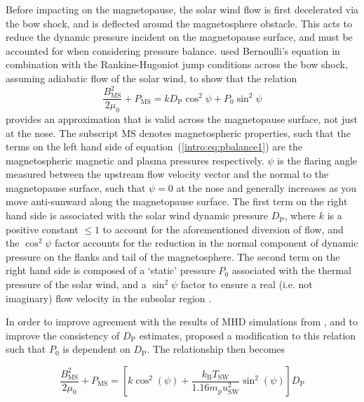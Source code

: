 Before impacting on the magnetopause, the solar wind flow is first decelerated via the bow shock, and is deflected around the magnetosphere obstacle. This acts to reduce the dynamic pressure incident on the magnetopause surface, and must be accounted for when considering pressure balance. \citet{petrinec1997} used Bernoulli's equation in combination with the Rankine-Hugoniot jump conditions across the bow shock, assuming adiabatic flow of the solar wind, to show that the relation
\begin{equation}\label{intro:eq:pbalance1}
\frac{B_{\mathrm{MS}}^2}{2\mu_0} + P_{\mathrm{MS}} = kD_\mathrm{P}\cos^2\psi + P_0\sin^2\psi
\end{equation}
provides an approximation that is valid across the magnetopause surface, not just at the nose. The subscript {\scshape{MS}} denotes magnetospheric properties, such that the terms on the left hand side of equation~(\ref{intro:eq:pbalance1}) are the magnetospheric magnetic and plasma pressures respectively. $\psi$ is the flaring angle measured between the upstream flow velocity vector and the normal to the magnetopause surface, such that $\psi=0$ at the nose and generally increases as you move anti-sunward along the magnetopause surface. The first term on the right hand side is associated with the solar wind dynamic pressure $D_\mathrm{P}$, where $k$ is a positive constant $\leq1$ to account for the aforementioned diversion of flow, and the $\cos^2\psi$ factor accounts for the reduction in the normal component of dynamic pressure on the flanks and tail of the magnetosphere. The second term on the right hand side is composed of a `static' pressure $P_0$ associated with the thermal pressure of the solar wind, and a $\sin^2\psi$ factor to ensure a real (i.e. not imaginary) flow velocity in the subsolar region \citep[see][]{petrinec1997}.

In order to improve agreement with the results of MHD simulations from \citet{hansen2005}, and to improve the consistency of $D_\mathrm{P}$ estimates, \citet{kanani2010} proposed a modification to this relation such that $P_0$ is dependent on $D_\mathrm{P}$. The relationship then becomes

\begin{equation}\label{intro:eq:pbalance2}
\frac{B_\mathrm{MS}^2}{2\mu_0} + P_\mathrm{MS} = \left[k\cos^2(\psi) + \frac{k_\mathrm{B}T_\mathrm{SW}}{1.16m_\mathrm{p}u_\mathrm{SW}^2}\sin^2(\psi)\right] D_\mathrm{P}
\end{equation}

